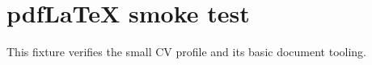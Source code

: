 \documentclass{article}
\begin{document}
\section*{pdfLaTeX smoke test}
This fixture verifies the small CV profile and its basic document tooling.
\end{document}
